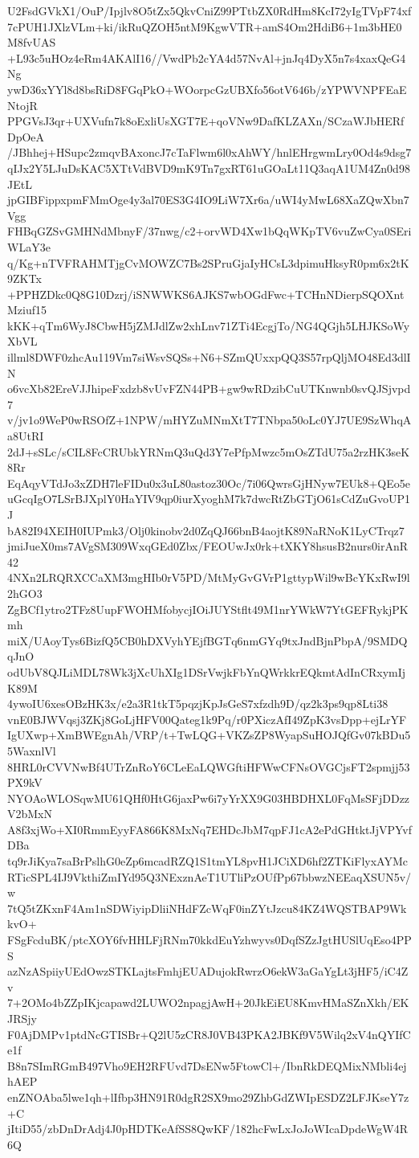 U2FsdGVkX1/OuP/Ipjlv8O5tZx5QkvCniZ99PTtbZX0RdHm8KcI72yIgTVpF74xf
7cPUH1JXlzVLm+ki/ikRuQZOH5ntM9KgwVTR+amS4Om2HdiB6+1m3bHE0M8fvUAS
+L93c5uHOz4eRm4AKAlI16//VwdPb2cYA4d57NvAl+jnJq4DyX5n7s4xaxQeG4Ng
ywD36xYYl8d8bsRiD8FGqPkO+WOorpcGzUBXfo56otV646b/zYPWVNPFEaENtojR
PPGVsJ3qr+UXVufn7k8oExliUsXGT7E+qoVNw9DafKLZAXn/SCzaWJbHERfDpOeA
/JBhhej+HSupc2zmqvBAxoncJ7cTaFlwm6l0xAhWY/hnlEHrgwmLry0Od4s9dsg7
qIJx2Y5LJuDsKAC5XTtVdBVD9mK9Tn7gxRT61uGOaLt11Q3aqA1UM4Zn0d98JEtL
jpGIBFippxpmFMmOge4y3al70ES3G4IO9LiW7Xr6a/uWI4yMwL68XaZQwXbn7Vgg
FHBqGZSvGMHNdMbnyF/37nwg/c2+orvWD4Xw1bQqWKpTV6vuZwCya0SEriWLaY3e
q/Kg+nTVFRAHMTjgCvMOWZC7Bs2SPruGjaIyHCsL3dpimuHksyR0pm6x2tK9ZKTx
+PPHZDkc0Q8G10Dzrj/iSNWWKS6AJKS7wbOGdFwc+TCHnNDierpSQOXntMziuf15
kKK+qTm6WyJ8CbwH5jZMJdlZw2xhLnv71ZTi4EcgjTo/NG4QGjh5LHJKSoWyXbVL
illml8DWF0zhcAu119Vm7siWsvSQSs+N6+SZmQUxxpQQ3S57rpQljMO48Ed3dlIN
o6vcXb82EreVJJhipeFxdzb8vUvFZN44PB+gw9wRDzibCuUTKnwnb0svQJSjvpd7
v/jv1o9WeP0wRSOfZ+1NPW/mHYZuMNmXtT7TNbpa50oLc0YJ7UE9SzWhqAa8UtRI
2dJ+sSLc/sCIL8FcCRUbkYRNmQ3uQd3Y7ePfpMwzc5mOsZTdU75a2rzHK3seK8Rr
EqAqyVTdJo3xZDH7leFIDu0x3uL80astoz30Oc/7i06QwrsGjHNyw7EUk8+QEo5e
uGcqIgO7LSrBJXplY0HaYIV9qp0iurXyoghM7k7dwcRtZbGTjO61sCdZuGvoUP1J
bA82I94XEIH0IUPmk3/Olj0kinobv2d0ZqQJ66bnB4aojtK89NaRNoK1LyCTrqz7
jmiJueX0ms7AVgSM309WxqGEd0Zbx/FEOUwJx0rk+tXKY8hsusB2nurs0irAnR42
4NXn2LRQRXCCaXM3mgHIb0rV5PD/MtMyGvGVrP1gttypWil9wBcYKxRwI9l2hGO3
ZgBCf1ytro2TFz8UupFWOHMfobycjIOiJUYStflt49M1nrYWkW7YtGEFRykjPKmh
miX/UAoyTys6BizfQ5CB0hDXVyhYEjfBGTq6nmGYq9txJndBjnPbpA/9SMDQqJnO
odUbV8QJLiMDL78Wk3jXcUhXIg1DSrVwjkFbYnQWrkkrEQkmtAdInCRxymIjK89M
4ywoIU6xesOBzHK3x/e2a3R1tkT5pqzjKpJsGeS7xfzdh9D/qz2k3ps9qp8Lti38
vnE0BJWVqsj3ZKj8GoLjHFV00Qateg1k9Pq/r0PXiczAfI49ZpK3vsDpp+ejLrYF
IgUXwp+XmBWEgnAh/VRP/t+TwLQG+VKZsZP8WyapSuHOJQfGv07kBDu55WaxnlVl
8HRL0rCVVNwBf4UTrZnRoY6CLeEaLQWGftiHFWwCFNsOVGCjsFT2spmjj53PX9kV
NYOAoWLOSqwMU61QHf0HtG6jaxPw6i7yYrXX9G03HBDHXL0FqMsSFjDDzzV2bMxN
A8f3xjWo+XI0RmmEyyFA866K8MxNq7EHDcJbM7qpFJ1cA2ePdGHtktJjVPYvfDBa
tq9rJiKya7saBrPslhG0eZp6mcadRZQ1S1tmYL8pvH1JCiXD6hf2ZTKiFlyxAYMc
RTicSPL4IJ9VkthiZmIYd95Q3NExznAeT1UTliPzOUfPp67bbwzNEEaqXSUN5v/w
7tQ5tZKxnF4Am1nSDWiyipDliiNHdFZcWqF0inZYtJzcu84KZ4WQSTBAP9WkkvO+
FSgFcduBK/ptcXOY6fvHHLFjRNm70kkdEuYzhwyvs0DqfSZzJgtHUSlUqEso4PPS
azNzASpiiyUEdOwzSTKLajtsFmhjEUADujokRwrzO6ekW3aGaYgLt3jHF5/iC4Zv
7+2OMo4bZZpIKjcapawd2LUWO2npagjAwH+20JkEiEU8KmvHMaSZnXkh/EKJRSjy
F0AjDMPv1ptdNcGTISBr+Q2lU5zCR8J0VB43PKA2JBKf9V5Wilq2xV4nQYIfCe1f
B8n7SImRGmB497Vho9EH2RFUvd7DsENw5FtowCl+/IbnRkDEQMixNMbli4ejhAEP
enZNOAba5lwe1qh+lIfbp3HN91R0dgR2SX9mo29ZhbGdZWIpESDZ2LFJKseY7z+C
jItiD55/zbDnDrAdj4J0pHDTKeAfSS8QwKF/182hcFwLxJoJoWIcaDpdeWgW4R6Q
